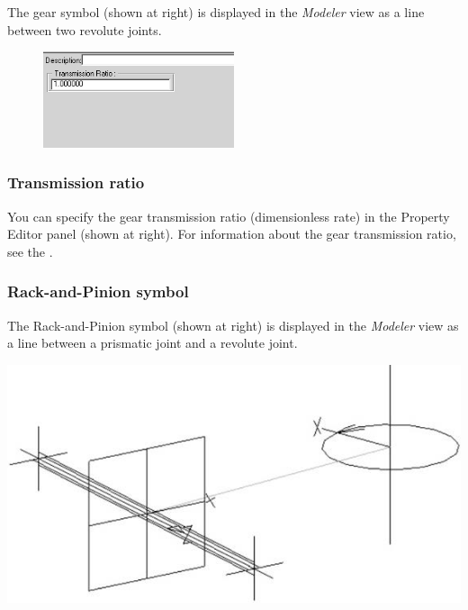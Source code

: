 The gear symbol (shown at right) is displayed in the {\sl Modeler} view
as a line between two revolute joints.

\begin{figure}
  \includegraphics[width=0.5\textwidth]{Figures/4-TransmissionRatio}
\end{figure}

\subsubsection{Transmission ratio}

You can specify the gear transmission ratio (dimensionless rate) in the
Property Editor panel (shown at right). For information about the gear
transmission ratio, see the .




\subsubsection{Rack-and-Pinion symbol}

\noindent
\begin{minipage}{0.6\textwidth}
  \raggedright
  The Rack-and-Pinion symbol (shown at right) is displayed in the
  {\sl Modeler} view as a line between a prismatic joint and a revolute
  joint.
\end{minipage}%
\begin{minipage}{0.4\textwidth}
  \raggedleft
  \includegraphics[scale=0.25]{Figures/4-rack-and-pinion-symbol}
\end{minipage}

